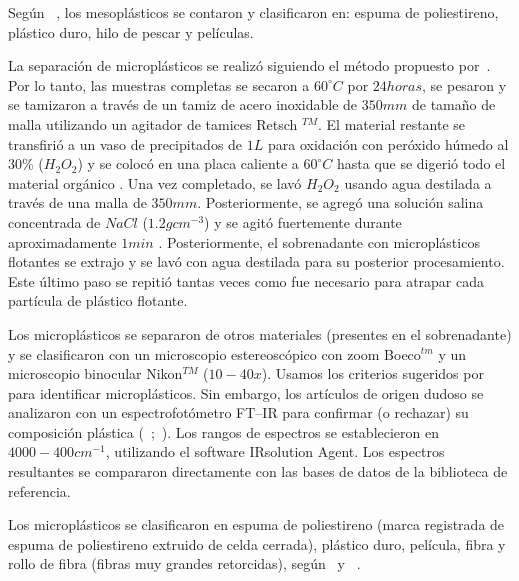 Según ~\cite{GUNDOGDU2017341}, los mesoplásticos se contaron y clasificaron en: espuma de poliestireno, plástico duro, hilo de pescar y películas.

La separación de microplásticos se realizó siguiendo el método propuesto por~\cite{masura2015laboratory}. Por lo tanto, las muestras completas se secaron a $60 ^{\circ}C$ por $24 horas$, se pesaron y se tamizaron a través de un tamiz de acero inoxidable de $350mm$ de tamaño de malla utilizando un agitador de tamices Retsch $^{TM}$. El material restante se transfirió a un vaso de precipitados de $1 L$ para oxidación con peróxido húmedo al $30\%$ ($H_2O_2$) y se colocó en una placa caliente a $60 ^{\circ}C$ hasta que se digerió todo el material orgánico \parencite{T.Yonkos2014}. Una vez completado, se lavó $H_2O_2$ usando agua destilada a través de una malla de $350mm$. Posteriormente, se agregó una solución salina concentrada de $NaCl$ ($1.2 g cm^{-3}$) y se agitó fuertemente durante aproximadamente $1min$ \parencite{Hidalgo-Ruz2012}. Posteriormente, el sobrenadante con microplásticos flotantes se extrajo y se lavó con agua destilada para su posterior procesamiento. Este último paso se repitió tantas veces como fue necesario para atrapar cada partícula de plástico flotante.

Los microplásticos se separaron de otros materiales (presentes en el sobrenadante) y se clasificaron con un microscopio estereoscópico con zoom Boeco$^{tm}$ y un microscopio binocular Nikon$^{TM}$ ($10-40x$). Usamos los criterios sugeridos por~\cite{noren2007small} para identificar microplásticos. Sin embargo, los artículos de origen dudoso se analizaron con un espectrofotómetro FT--IR para confirmar (o rechazar) su composición plástica (~\cite{FRIAS201489};~\cite{LI2016177}). Los rangos de espectros se establecieron en $4000-400 cm^{-1}$, utilizando el software IRsolution Agent. Los espectros resultantes se compararon directamente con las bases de datos de la biblioteca de referencia.

Los microplásticos se clasificaron en espuma de poliestireno (marca registrada de espuma de poliestireno extruido de celda cerrada), plástico duro, película, fibra y rollo de fibra (fibras muy grandes retorcidas), según~\cite{doi:10.1139/cjfas-2014-0281} y ~\cite{GUNDOGDU2017341}.

